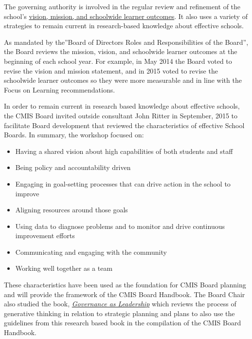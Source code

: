 \begin{findings}

The governing authority is involved in the regular review and refinement of the school’s \href{http://cmis.ac.th/about/vision}{vision, mission, and schoolwide learner outcomes}. It also uses a variety of strategies to remain current in research-based knowledge about effective schools.

As mandated by the”Board of Directors Roles and Responsibilities of the Board”, the Board reviews the mission, vision, and schoolwide learner outcomes at the beginning of each school year. For example, in May 2014 the Board voted to revise the vision and mission statement, and in 2015 voted to revise the schoolwide learner outcomes so they were more measurable and in line with the Focus on Learning recommendations. 

In order to remain current in research based knowledge about effective schools, the CMIS Board invited outside consultant John Ritter in September, 2015 to facilitate Board development  that reviewed the characteristics of effective School Boards. In summary, the workshop focused on:

\begin{itemize}
\item Having a shared vision about high capabilities of both students and staff
\item Being policy and accountability driven
\item Engaging in goal-setting processes that can drive action in the school to improve
\item Aligning resources around those goals
\item Using data to diagnose problems and to monitor and drive continuous improvement efforts
\item Communicating and engaging with the community
\item Working well together as a team 
\end{itemize}

These characteristics have been used as the foundation for CMIS Board planning and will provide the framework of the CMIS Board Handbook. The Board Chair also studied the book, \href{https://www.amazon.com/Governance-Leadership-Reframing-Nonprofit-Boards/dp/0471684201}{\textit{Governance as Leadership}}  which reviews the process of generative thinking in relation to strategic planning and plans to also use the guidelines from this research based book in the compilation of the CMIS Board Handbook.


\end{findings}
